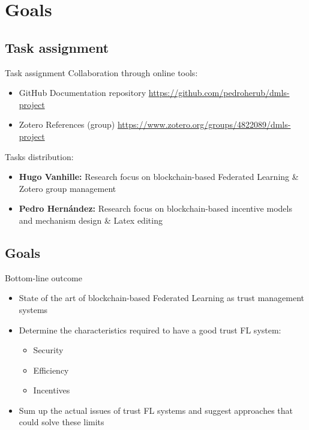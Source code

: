 

\section{Goals}

\subsection{Task assignment}

\begin{frame}{Task assignment}
	Collaboration through online tools:
  \begin{itemize}
  	\item \alert{GitHub} Documentation repository \url{https://github.com/pedroherub/dmls-project}
  	\item \alert{Zotero} References (group)  \url{https://www.zotero.org/groups/4822089/dmls-project}
  \end{itemize}
  Tasks distribution:
  \begin{itemize}
  	\item \textbf{Hugo Vanhille:} Research focus on blockchain-based Federated Learning \& Zotero group management
  	\item \textbf{Pedro Hernández:} Research focus on blockchain-based incentive models and mechanism design \& Latex editing
  \end{itemize}
\end{frame}

\subsection{Goals}

\begin{frame}{Bottom-line outcome}
\begin{itemize}
\item State of the art of blockchain-based Federated Learning as \alert{trust management systems}
\item Determine the characteristics required to have a good trust FL system:
	\begin{itemize}
		\item Security
		\item Efficiency
		\item Incentives
	\end{itemize}
\item Sum up the actual issues of trust FL systems and suggest approaches that could solve these limits
\end{itemize}

\end{frame}

